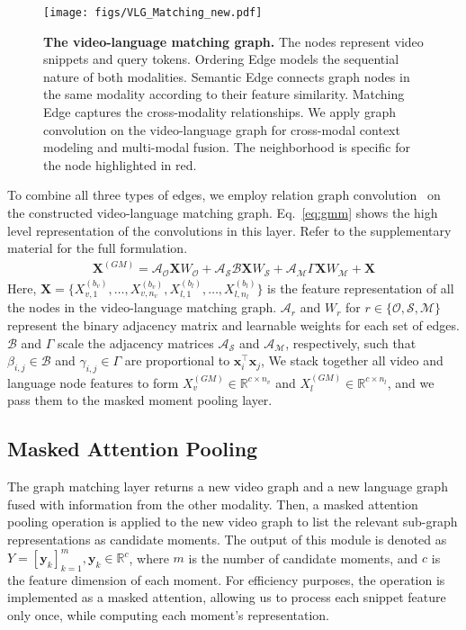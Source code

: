 \documentclass[10pt,twocolumn,letterpaper]{article}
\begin{document}
\begin{figure}[!t]
\centering
    \texttt{[image: figs/VLG\_Matching\_new.pdf]}
    \caption{\textbf{The video-language matching graph.} 
    The nodes represent video snippets and query tokens. 
    Ordering Edge models the sequential nature of both modalities.
    Semantic Edge connects graph nodes in the same modality according to their feature similarity.
    Matching Edge captures the cross-modality relationships.
    We apply graph convolution on the video-language graph for cross-modal context modeling and multi-modal fusion. The neighborhood is specific for the node highlighted in red. 
    } 
    \label{fig:gmn}
\end{figure}
To combine all three types of edges, we employ relation graph convolution~\cite{schlichtkrull2017modeling} on the constructed video-language matching graph. Eq.~\ref{eq:gmm} shows the high level representation of the convolutions in this layer. Refer to the supplementary material for the full formulation. 
\begin{align} \label{eq:gmm} 
   \mathbf{X}^{(GM)}\! =\! \mathcal{A}_\mathcal{O} \mathbf{X} W_\mathcal{O}\! +\! \mathcal{A}_\mathcal{S} \mathcal{B} \mathbf{X}  W_\mathcal{S}\! +\! \mathcal{A}_\mathcal{M} \Gamma \mathbf{X} W_\mathcal{M}\! +\! \mathbf{X}
\end{align}
Here, $\mathbf{X} = \{{X_{v,1}^{(b_v)},\dots,X_{v,n_v}^{(b_v)},X_{l,1}^{(b_l)},\dots,X_{l,n_l}^{(b_l)}}\}$ is the feature representation of all the nodes in the video-language matching graph. 
$\mathcal{A}_{r}$ and $W_{r}$ for $r\in \{ \mathcal{O},\mathcal{S},\mathcal{M}\}$ represent the binary adjacency matrix and learnable weights for each set of edges. 
$\mathcal{B}$ and $\Gamma$ scale the adjacency matrices $\mathcal{A}_\mathcal{S}$ and $\mathcal{A}_\mathcal{M}$, respectively, such that $\beta_{i,j} \in \mathcal{B}$ and $\gamma_{i,j} \in \Gamma$ are proportional to $\mathbf{x}_i^{\top} \mathbf{x}_j$,
We stack together all video and language node features to form $X_v^{(GM)}\in \mathbb{R}^{c\times n_v}$ and $X_l^{(GM)}\in \mathbb{R}^{c\times n_l}$, and we pass them to the masked moment pooling layer.


\subsection{Masked Attention Pooling}\label{subsec: Pool}
The graph matching layer returns a new video graph and a new language graph fused with information from the other modality. Then, a masked attention pooling operation is applied to the new video graph to list the relevant sub-graph representations as candidate moments. The output of this module is denoted as $Y= [\mathbf{y}_k]_{k=1}^{m}, \mathbf{y}_k\in \mathbb{R}^{c}$, where $m$ is the number of candidate moments, and $c$ is the feature dimension of each moment. For efficiency purposes, the operation is implemented as a masked attention, allowing us to process each snippet feature only once, while computing each moment's representation.
\end{document}
